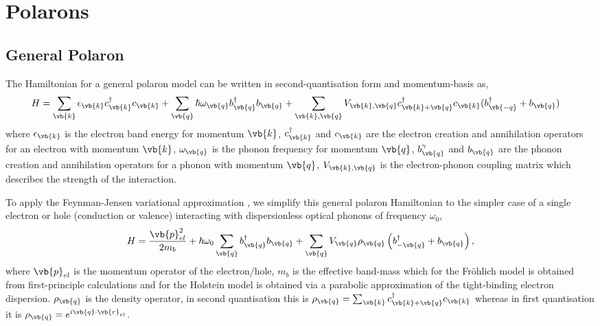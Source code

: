 \chapter{Polarons}
\label{chap:fourth}

\section{General Polaron}

The Hamiltonian for a general polaron model \cite{Alexandrov2009} can be written in second-quantisation form and momentum-basis as,
\begin{equation}
    \begin{aligned}
        H &= \sum_{\vb{k}} \epsilon_{\vb{k}} c^\dagger_{\vb{k}} c_{\vb{k}} + \sum_{\vb{q}} \hbar \omega_{\vb{q}} b^\dagger_{\vb{q}} b_{\vb{q}} + \sum_{\vb{k},\vb{q}} V_{\vb{k}, \vb{q}} c^\dagger_{\vb{k}+\vb{q}} c_{\vb{k}} (b^\dagger_{\vb{-q}} + b_{\vb{q}})
    \end{aligned}
\end{equation} 
where $\epsilon_{\vb{k}}$ is the electron band energy for momentum $\vb{k}$, $c^\dagger_{\vb{k}}$ and $c_{\vb{k}}$ are the electron creation and annihilation operators for an electron with momentum $\vb{k}$, $\omega_{\vb{q}}$ is the phonon frequency for momentum $\vb{q}$, $b^\gamma_{\vb{q}}$ and $b_{\vb{q}}$ are the phonon creation and annihilation operators for a phonon with momentum $\vb{q}$, $V_{\vb{k}, \vb{q}}$ is the electron-phonon coupling matrix which describes the strength of the interaction.
\newline

To apply the Feynman-Jensen variational approximation \cite{Feynman1955}, we simplify this general polaron Hamiltonian to the simpler case of a single electron or hole (conduction or valence) interacting with dispersionless optical phonons of frequency $\omega_0$,
\begin{equation}
    H = \frac{\vb{p}^2_{el}}{2m_b} + \hbar\omega_{0} \sum_{\vb{q}} 
    b^{\dagger}_{\vb{q}}b_{\vb{q}} + \sum_{\vb{q}} V_{\vb{q}} \rho_{\vb{q}} \left( b^\dagger_{-\vb{q}} + b_{\vb{q}} \right),
\end{equation}
where $\vb{p}_{el}$ is the momentum operator of the electron/hole, $m_b$ is the effective band-mass which for the Fr\"ohlich model \cite{frohlich} is obtained from first-principle calculations and for the Holstein model \cite{HolsteinI1959, HolsteinII1959} is obtained via a parabolic approximation of the tight-binding electron dispersion. $\rho_{\vb{q}}$ is the density operator, in second quantisation this is $\rho_{\vb{q}} = 
\sum_{\vb{k}} c^\dagger_{\vb{k}+\vb{q}} c_{\vb{k}}$ whereas in first quantisation it is $\rho_{\vb{q}} = e^{i \vb{q} \cdot \vb{r}_{el}}$.

